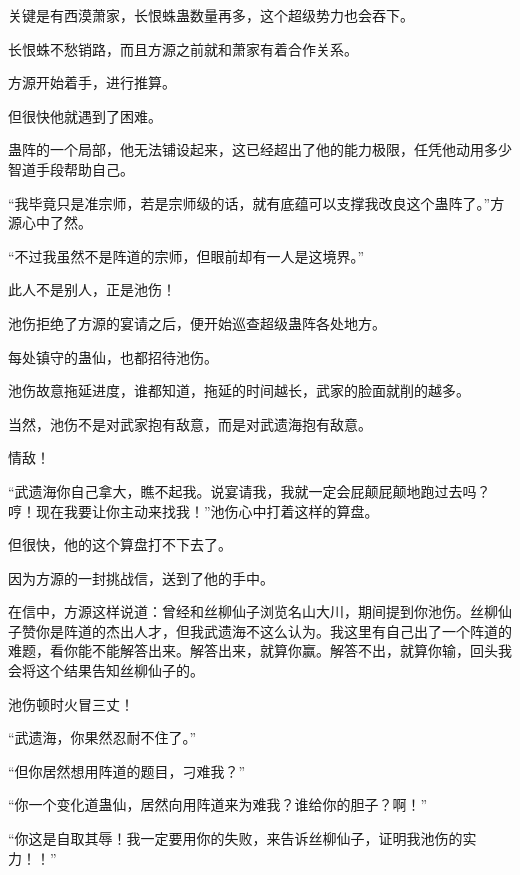 \begin{this_body}
关键是有西漠萧家，长恨蛛蛊数量再多，这个超级势力也会吞下。

长恨蛛不愁销路，而且方源之前就和萧家有着合作关系。

方源开始着手，进行推算。

但很快他就遇到了困难。

蛊阵的一个局部，他无法铺设起来，这已经超出了他的能力极限，任凭他动用多少智道手段帮助自己。

“我毕竟只是准宗师，若是宗师级的话，就有底蕴可以支撑我改良这个蛊阵了。”方源心中了然。

“不过我虽然不是阵道的宗师，但眼前却有一人是这境界。”

此人不是别人，正是池伤！

池伤拒绝了方源的宴请之后，便开始巡查超级蛊阵各处地方。

每处镇守的蛊仙，也都招待池伤。

池伤故意拖延进度，谁都知道，拖延的时间越长，武家的脸面就削的越多。

当然，池伤不是对武家抱有敌意，而是对武遗海抱有敌意。

情敌！

“武遗海你自己拿大，瞧不起我。说宴请我，我就一定会屁颠屁颠地跑过去吗？哼！现在我要让你主动来找我！”池伤心中打着这样的算盘。

但很快，他的这个算盘打不下去了。

因为方源的一封挑战信，送到了他的手中。

在信中，方源这样说道：曾经和丝柳仙子浏览名山大川，期间提到你池伤。丝柳仙子赞你是阵道的杰出人才，但我武遗海不这么认为。我这里有自己出了一个阵道的难题，看你能不能解答出来。解答出来，就算你赢。解答不出，就算你输，回头我会将这个结果告知丝柳仙子的。

池伤顿时火冒三丈！

“武遗海，你果然忍耐不住了。”

“但你居然想用阵道的题目，刁难我？”

“你一个变化道蛊仙，居然向用阵道来为难我？谁给你的胆子？啊！”

“你这是自取其辱！我一定要用你的失败，来告诉丝柳仙子，证明我池伤的实力！！”

\end{this_body}

